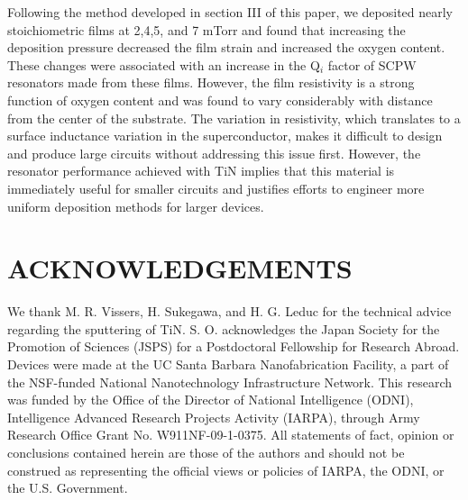 \documentclass{report}
\begin{document}
Following the method developed in section III of this paper, we deposited nearly stoichiometric films at 2,4,5, and 7 mTorr and found that increasing the deposition pressure decreased the film strain and increased the oxygen content.  These changes were associated with an increase in the Q$_{i}$ factor of SCPW resonators made from these films.  However, the film resistivity is a strong function of oxygen content and was found to vary considerably with distance from the center of the substrate.  The variation in resistivity, which translates to a surface inductance variation in the superconductor, makes it difficult to design and produce large circuits without addressing this issue first.  However, the resonator performance achieved with TiN implies that this material is immediately useful for smaller circuits and justifies efforts to engineer more uniform deposition methods for larger devices.

\section*{ACKNOWLEDGEMENTS}%

We thank M. R. Vissers, H. Sukegawa, and H. G. Leduc for the technical advice regarding the sputtering of TiN. S. O. acknowledges the Japan Society for the Promotion of Sciences (JSPS) for a Postdoctoral Fellowship for Research Abroad.  Devices were made at the UC Santa Barbara Nanofabrication Facility, a part of the NSF-funded National Nanotechnology Infrastructure Network. This research was funded by the Office of the Director of National Intelligence (ODNI), Intelligence Advanced Research Projects Activity (IARPA), through Army Research Office Grant No. W911NF-09-1-0375. All statements of fact, opinion or conclusions contained herein are those of the authors and should not be construed as representing the official views or policies of IARPA, the ODNI, or the U.S. Government.
\end{document}
